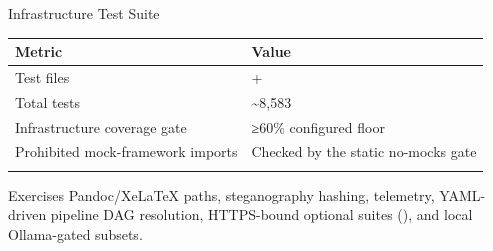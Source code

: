 \documentclass[
  ignorenonframetext,
]{beamer}
\newcounter{none} %
\begin{document}
\begin{frame}{Infrastructure Test Suite}
\protect{}\label{infrastructure-test-suite}
{\def\LTcaptype{none} %
\begin{longtable}[]{@{}
  >{\raggedright\arraybackslash}p{}
  >{\raggedright\arraybackslash}p{}@{}}
\toprule\noalign{}
\begin{minipage}[b]{\linewidth}\raggedright
Metric
\end{minipage} & \begin{minipage}[b]{\linewidth}\raggedright
Value
\end{minipage} \\
\midrule\noalign{}
\endhead
Test files & 504+ \\
Total tests & \textasciitilde8,583 \\
Infrastructure coverage gate & ≥60\% configured floor \\
Prohibited mock-framework imports & Checked by the static no-mocks
gate \\
\bottomrule\noalign{}
\end{longtable}
}

Exercises Pandoc/XeLaTeX paths, steganography hashing, telemetry,
YAML-driven pipeline DAG resolution, HTTPS-bound optional suites
(), and local Ollama-gated subsets.
\end{frame}
\end{document}

